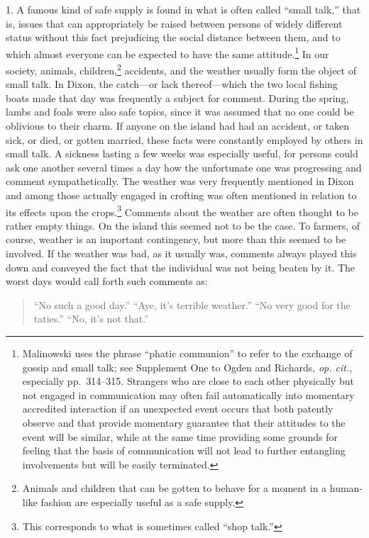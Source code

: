 \documentclass[openany,nobib]{tufte-book}
\begin{document}
1. A famous kind of safe supply is found in what is often called ``small
talk,'' that is, issues that can appropriately be raised between persons
of widely different status without this fact prejudicing the social
distance between them, and to which almost everyone can be expected to
have the same attitude.\footnote{Malinowski uses the phrase ``phatic
  communion'' to refer to the exchange of gossip and small talk; see
  Supplement One to Ogden and Richards, \emph{op. cit.}, especially
  pp.~314--315. Strangers who are close to each other physically but not
  engaged in communication may often fail automatically into momentary
  accredited interaction if an unexpected event occurs that both
  patently observe and that provide momentary guarantee that their
  attitudes to the event will be similar, while at the same time
  providing some grounds for feeling that the basis of communication
  will not lead to further entangling involvements but will be easily
  terminated.} In our society, animals, children,\footnote{Animals and
  children that can be gotten to behave for a moment in a human-like
  fashion are especially useful as a safe supply.} accidents, and the
weather usually form the object of small talk. In Dixon, the catch---or
lack thereof---which the two local fishing boats made that day was
frequently a subject for comment. During the spring, lambs and foals
were also safe topics, since it was assumed that no one could be
oblivious to their charm. If anyone on the island had had an accident,
or taken sick, or died, or gotten married, these facts were constantly
employed by others in small talk. A sickness lasting a few weeks was
especially useful, for persons could ask one another several times a day
how the unfortunate one was progressing and comment sympathetically. The
weather was very frequently mentioned in Dixon and among those actually
engaged in crofting was often mentioned in relation to its effects upon
the crops.\footnote{This corresponds to what is sometimes called ``shop
  talk.''} Comments about the weather are often thought to be rather
empty things. On the island this seemed not to be the case. To farmers,
of course, weather is an important contingency, but more than this
seemed to be involved. If the weather was bad, as it usually was,
comments always played this down and conveyed the fact that the
individual was not being beaten by it. The worst days would call forth
such comments as:

\begin{quote}
``No such a good day.'' ``Aye, it's terrible weather.'' ``No very good
for the taties.'' ``No, it's not that.''
\end{quote}
\end{document}
